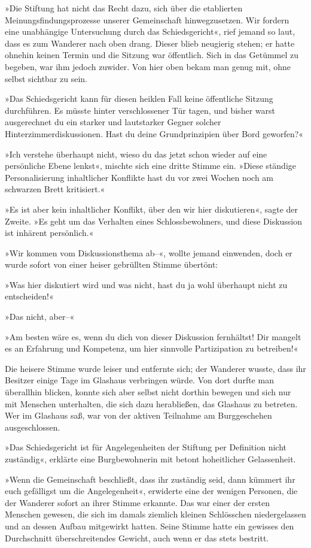 »Die Stiftung hat nicht das Recht dazu, sich über die etablierten Meinungsfindungsprozesse unserer Gemeinschaft hinwegzusetzen. Wir fordern eine unabhängige Untersuchung durch das Schiedsgericht«, rief jemand so laut, dass es zum Wanderer nach oben drang. Dieser blieb neugierig stehen; er hatte ohnehin keinen Termin und die Sitzung war öffentlich. Sich in das Getümmel zu begeben, war ihm jedoch zuwider. Von hier oben bekam man genug mit, ohne selbst sichtbar zu sein.

»Das Schiedsgericht kann für diesen heiklen Fall keine öffentliche Sitzung durchführen. Es müsste hinter verschlossener Tür tagen, und bisher warst ausgerechnet du ein starker und lautstarker Gegner solcher Hinterzimmerdiskussionen. Hast du deine Grundprinzipien über Bord geworfen?«

»Ich verstehe überhaupt nicht, wieso du das jetzt schon wieder auf eine persönliche Ebene lenkst«, mischte sich eine dritte Stimme ein. »Diese ständige Personalisierung inhaltlicher Konflikte hast du vor zwei Wochen noch am schwarzen Brett kritisiert.«

»Es ist aber kein inhaltlicher Konflikt, über den wir hier diskutieren«, sagte der Zweite. »Es geht um das Verhalten eines Schlossbewohners, und diese Diskussion ist inhärent persönlich.«

»Wir kommen vom Diskussionsthema ab–«, wollte jemand einwenden, doch er wurde sofort von einer heiser gebrüllten Stimme übertönt:

»Was hier diskutiert wird und was nicht, hast du ja wohl überhaupt nicht zu entscheiden!«

»Das nicht, aber–«

»Am besten wäre es, wenn du dich von dieser Diskussion fernhältst! Dir mangelt es an Erfahrung und Kompetenz, um hier sinnvolle Partizipation zu betreiben!«

Die heisere Stimme wurde leiser und entfernte sich; der Wanderer wusste, dass ihr Besitzer einige Tage im Glashaus verbringen würde. Von dort durfte man überallhin blicken, konnte sich aber selbst nicht dorthin bewegen und sich nur mit Menschen unterhalten, die sich dazu herabließen, das Glashaus zu betreten. Wer im Glashaus saß, war von der aktiven Teilnahme am Burggeschehen ausgeschlossen.

»Das Schiedsgericht ist für Angelegenheiten der Stiftung per Definition nicht zuständig«, erklärte eine Burgbewohnerin mit betont hoheitlicher Gelassenheit.

»Wenn die Gemeinschaft beschließt, dass ihr zuständig seid, dann kümmert ihr euch gefälligst um die Angelegenheit«, erwiderte eine der wenigen Personen, die der Wanderer sofort an ihrer Stimme erkannte. Das war einer der ersten Menschen gewesen, die sich im damals ziemlich kleinen Schlösschen niedergelassen und an dessen Aufbau mitgewirkt hatten. Seine Stimme hatte ein gewisses den Durchschnitt überschreitendes Gewicht, auch wenn er das stets bestritt.

